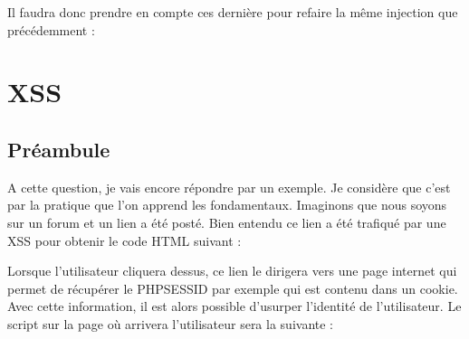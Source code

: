 \documentclass{article}
\begin{document}
Il faudra donc prendre en compte ces dernière pour refaire la même injection que précédemment :
\vspace{0.2cm}\\
\vspace{0.2cm}

\newpage
\section{XSS}
\subsection{Préambule}
A cette question, je vais encore répondre par un exemple. Je considère que c'est par la pratique que l'on apprend les fondamentaux. Imaginons que nous soyons sur un forum et un lien a été posté. Bien entendu ce lien a été trafiqué par une XSS pour obtenir le code HTML suivant :
\vspace{0.2cm}\\
\vspace{0.2cm}

Lorsque l'utilisateur cliquera dessus, ce lien le dirigera vers une page internet qui permet de récupérer le PHPSESSID par exemple qui est contenu dans un cookie. Avec cette information, il est alors possible d'usurper l'identité de l'utilisateur. Le script sur la page où arrivera l'utilisateur sera la suivante :
\vspace{0.2cm}\\
\vspace{0.2cm}
\end{document}
